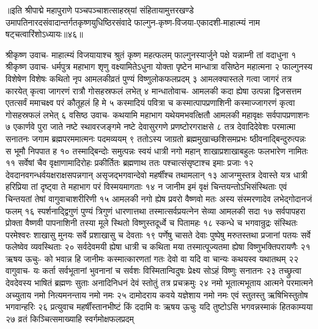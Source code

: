 ॥इति श्रीपाद्मे महापुराणे पञ्चपञ्चाशत्साहस्र्यां संहितायामुत्तरखण्डे उमापतिनारदसंवादान्तर्गतकृष्णयुधिष्ठिरसंवादे फाल्गुन-कृष्ण-विजया-एकादशी-माहात्म्यं नाम षट्चत्वारिंशोऽध्यायः॥४६॥



श्रीकृष्ण उवाच-
माहात्म्यं विजयायाश्च श्रुतं कृष्ण महत्फलम् 
फाल्गुनस्यार्जुने पक्षे यन्नाम्नी तां वदाधुना १
श्रीकृष्ण उवाच-
धर्मपुत्र महाभाग शृणु वक्ष्यामितेऽधुना 
योक्ता पृष्टेन मान्धात्रा वसिष्ठेन महात्मना २
फाल्गुनस्य विशेषेण विशेषः कथितो नृप 
आमलकीव्रतं पुण्यं विष्णुलोकफलप्रदम् ३
आमलक्यास्तले गत्वा जागरं तत्र कारयेत् 
कृत्वा जागरणं रात्रौ गोसहस्रफलं लभेत् ४
मान्धातोवाच-
आमलकी कदा ह्येषा उत्पन्ना द्विजसत्तम 
एतत्सर्वं ममाचक्ष्व परं कौतूहलं हि मे ५
कस्मादियं पवित्रा च कस्मात्पापप्रणाशिनी 
कस्माज्जागरणं कृत्वा गोसहस्रफलं लभेत् ६
वसिष्ठ उवाच-
कथयामि महाभाग यथेयमभवत्क्षितौ 
आमलकी महावृक्षः सर्वपापप्रणाशनः ७
एकार्णवे पुरा जाते नष्टे स्थावरजङ्गमे 
नष्टे देवासुरगणे प्रणष्टोरगराक्षसे ८
तत्र देवादिदेवेशः परमात्मा सनातनः 
जगाम ब्रह्मपरममात्मनः पदमव्ययम् ९
ततोऽस्य जाग्रतो ब्रह्ममुखाच्छशिसमप्रभः 
ष्ठीवनाद्बिन्दुरुत्पन्नः स भूमौ निपपात ह १०
तस्माद्बिन्दोः समुत्पन्नः स्वयं धात्री नगो महान् 
शाखाप्रशाखाबहुलः फलभारेण नामितः ११
सर्वेषां चैव वृक्षाणामादिरोहः प्रकीर्तितः 
ब्रह्मणाथ ततः पश्चात्संसृष्टाश्च इमाः प्रजाः १२
देवदानवगन्धर्वयक्षराक्षसपन्नगान् 
असृजद्भगवान्देवो महर्षींश्च तथामलान् १३
आजग्मुस्तत्र देवास्ते यत्र धात्री हरिप्रिया 
तां दृष्ट्वा ते महाभाग परं विस्मयमागताः १४
न जानीम इमं वृक्षं चिन्तयन्तोऽभिसंस्थिताः 
एवं चिन्तयतां तेषां वागुवाचाशरीरिणी १५
आमलकी नगो ह्येष प्रवरो वैष्णवो मतः 
अस्य संस्मरणादेव लभेद्गोदानजं फलम् १६
स्पर्शनाद्द्विगुणं पुण्यं त्रिगुणं धारणात्तथा 
तस्मात्सर्वप्रयत्नेन सेव्या आमलकी सदा १७
सर्वपापहरा प्रोक्ता वैष्णवी पापनाशिनी 
तस्या मूले स्थितो विष्णुस्तदूर्ध्वे च पितामहः १८
स्कन्धे च भगवान्रुद्रः संस्थितः परमेश्वरः 
शाखासु मुनयः सर्वे प्रशाखासु च देवताः १९
पर्णेषु चासते देवाः पुष्पेषु मरुतस्तथा 
प्रजानां पतयः सर्वे फलेष्वेव व्यवस्थिताः २०
सर्वदेवमयी ह्येषा धात्री च कथिता मया 
तस्मात्पूज्यतमा ह्येषा विष्णुभक्तिपरायणैः २१
ऋषय ऊचुः-
को भवान्न हि जानीमः कस्मात्कारणतां गतः 
देवो वा यदि वा चान्यः कथयस्व यथातथम् २२
वागुवाच-
यः कर्ता सर्वभूतानां भुवनानां च सर्वशः 
विस्मितान्विदुषः प्रेक्ष्य सोऽहं विष्णुः सनातनः २३
तच्छ्रुत्वा देवदेवस्य भाषितं ब्रह्मणः सुताः 
अनादिनिधनं देवं स्तोतुं तत्र प्रचक्रमुः २४
नमो भूतात्मभूताय आत्मने परमात्मने 
अच्युताय नमो नित्यमनन्ताय नमो नमः २५
दामोदराय कवये यज्ञेशाय नमो नमः 
एवं स्तुतस्तु ऋषिभिस्तुतोष भगवान्हरिः २६
प्रत्युवाच महर्षींस्तानभीष्टं किं ददामि वः 
ऋषय ऊचुः
यदि तुष्टोऽसि भगवन्नस्माकं हितकाम्यया २७
व्रतं किञ्चित्समाख्याहि स्वर्गमोक्षफलप्रदम् 
